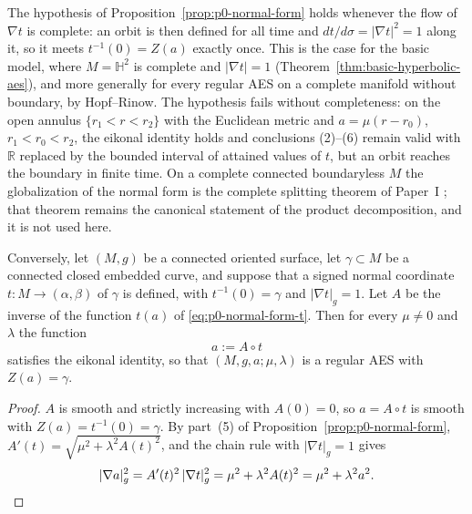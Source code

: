 \begin{remark}\label{rem:p0-normal-form-hypotheses}
The hypothesis of Proposition~\ref{prop:p0-normal-form} holds whenever the flow
of $\nabla t$ is complete: an orbit is then defined for all time and
$dt/d\sigma=|\nabla t|^2=1$ along it, so it meets $t^{-1}(0)=Z(a)$ exactly once.
This is the case for the basic model, where $M=\mathbb H^2$ is complete and
$|\nabla t|=1$ (Theorem~\ref{thm:basic-hyperbolic-aes}), and more generally for
every regular AES on a complete manifold without boundary, by Hopf--Rinow.  The
hypothesis fails without completeness: on the open annulus $\{r_1<r<r_2\}$ with
the Euclidean metric and $a=\mu(r-r_0)$, $r_1<r_0<r_2$, the eikonal identity
holds and conclusions (2)--(6) remain valid with $\mathbb R$ replaced by the
bounded interval of attained values of $t$, but an orbit reaches the boundary in
finite time.  On a complete connected boundaryless $M$ the globalization of the
normal form is the complete splitting theorem of Paper~I
\cite{Yuan2026AEGFoundations}; that theorem remains the canonical statement of
the product decomposition, and it is not used here.
\end{remark}

\begin{proposition}
\label{prop:p0-normal-form-realization}
Conversely, let $(M,g)$ be a connected oriented surface, let $\gamma\subset M$ be
a connected closed embedded curve, and suppose that a signed normal coordinate
$t:M\to(\alpha,\beta)$ of $\gamma$ is defined, with $t^{-1}(0)=\gamma$ and
$|\nabla t|_g=1$.  Let $A$ be the inverse of the function $t(a)$ of
\eqref{eq:p0-normal-form-t}.  Then for every $\mu\ne0$ and $\lambda$ the
function
\begin{equation}\label{eq:p0-normal-form-realization}
 a:=A\circ t
\end{equation}
satisfies the eikonal identity, so that $(M,g,a;\mu,\lambda)$ is a regular AES
with $Z(a)=\gamma$.
\end{proposition}

\begin{proof}
$A$ is smooth and strictly increasing with $A(0)=0$, so $a=A\circ t$ is smooth
with $Z(a)=t^{-1}(0)=\gamma$.  By part~(5) of
Proposition~\ref{prop:p0-normal-form}, $A'(t)=\sqrt{\mu^2+\lambda^2A(t)^2}$, and
the chain rule with $|\nabla t|_g=1$ gives
\[
 |\nabla a|_g^2=A'(t)^2\,|\nabla t|_g^2
 =\mu^2+\lambda^2A(t)^2=\mu^2+\lambda^2a^2 . \qedhere
\]
\end{proof}

